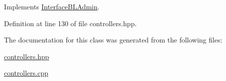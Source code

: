 Implements \hyperlink{class_interface_b_l_admin_abe950882707e9b393dd989af66ab2f9f}{Interface\+B\+L\+Admin}.



Definition at line 130 of file controllers.\+hpp.



The documentation for this class was generated from the following files\+:\begin{DoxyCompactItemize}
\item 
\hyperlink{controllers_8hpp}{controllers.\+hpp}\item 
\hyperlink{controllers_8cpp}{controllers.\+cpp}\end{DoxyCompactItemize}
